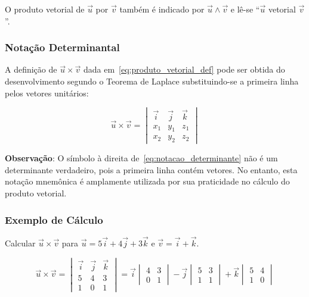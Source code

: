 O produto vetorial de $\vec{u}$ por $\vec{v}$ também é indicado por $\vec{u}
\wedge \vec{v}$ e lê-se ``$\vec{u}$ vetorial $\vec{v}$''.

\subsubsection*{Notação Determinantal}

A definição de $\vec{u} \times \vec{v}$ dada em~\eqref{eq:produto_vetorial_def}
pode ser obtida do desenvolvimento segundo o Teorema de Laplace substituindo-se
a primeira linha pelos vetores unitários:

\begin{equation}
  \vec{u} \times \vec{v} = 
  \begin{vmatrix}
    \vec{i} & \vec{j} & \vec{k} \\
    x_1 & y_1 & z_1 \\
    x_2 & y_2 & z_2 
  \end{vmatrix}
  \label{eq:notacao_determinante}
\end{equation}

\begin{center}
\begin{minipage}{0.9\textwidth}
\textbf{Observação}: O símbolo à direita de~\eqref{eq:notacao_determinante} não
  é um determinante verdadeiro, pois a primeira linha contém vetores. No
  entanto, esta notação mnemônica é amplamente utilizada por sua praticidade no
  cálculo do produto vetorial.
\end{minipage}
\end{center}

\subsubsection*{Exemplo de Cálculo}

Calcular $\vec{u} \times \vec{v}$ para $\vec{u} = 5\vec{i} + 4\vec{j} +
3\vec{k}$ e $\vec{v} = \vec{i} + \vec{k}$.

\[
  \vec{u} \times \vec{v} = 
  \begin{vmatrix}
    \vec{i} & \vec{j} & \vec{k} \\
    5 & 4 & 3 \\
    1 & 0 & 1 
  \end{vmatrix}
  = \vec{i} \begin{vmatrix} 4 & 3 \\ 0 & 1 \end{vmatrix} 
  - \vec{j} \begin{vmatrix} 5 & 3 \\ 1 & 1 \end{vmatrix} 
  + \vec{k} \begin{vmatrix} 5 & 4 \\ 1 & 0 \end{vmatrix}
\]

